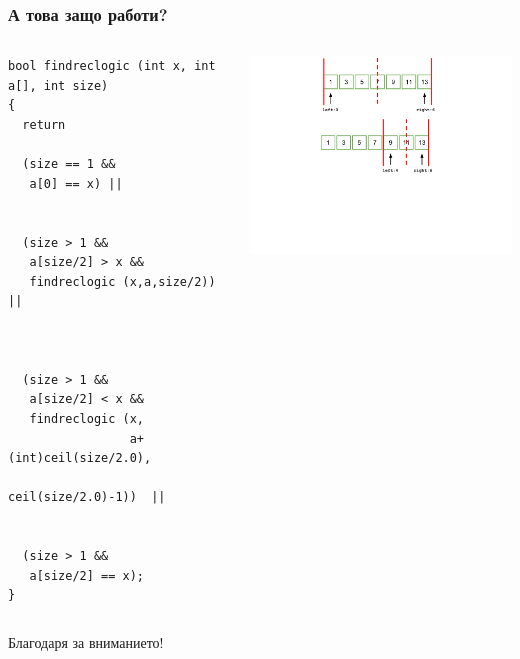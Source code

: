 \documentclass{beamer}
\begin{document}
\begin{frame}[fragile]
\frametitle{А това защо работи?}



\begin{columns}[t]
  \begin{column}{0.5\textwidth}

\begin{lstlisting}
bool findreclogic (int x, int a[], int size)
{
  return

  (size == 1 &&
   a[0] == x) ||


  (size > 1 &&
   a[size/2] > x &&
   findreclogic (x,a,size/2)) ||



  (size > 1 &&
   a[size/2] < x &&
   findreclogic (x,
                 a+(int)ceil(size/2.0),
                 ceil(size/2.0)-1))  ||


  (size > 1 &&
   a[size/2] == x);
}
\end{lstlisting}


  \end{column}
  \begin{column}{0.5\textwidth}
\vspace*{-1pt}
\hspace*{-50pt}
\includegraphics[width=10cm]{images/binsearch_smaller}

  \end{column}
\end{columns}



\end{frame}



\begin{frame}
\centerline{Благодаря за вниманието!}
\end{frame}
\end{document}
